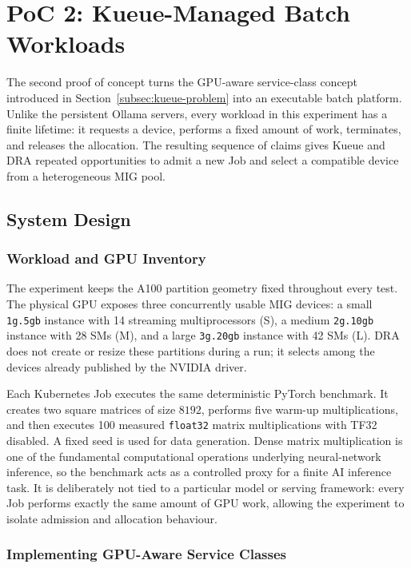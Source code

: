 \section{PoC 2: Kueue-Managed Batch Workloads}
\label{sec:kueue-use-case}

The second proof of concept turns the GPU-aware service-class concept introduced in Section~\ref{subsec:kueue-problem} into an executable batch platform. Unlike the persistent Ollama servers, every workload in this experiment has a finite lifetime: it requests a device, performs a fixed amount of work, terminates, and releases the allocation. The resulting sequence of claims gives Kueue and DRA repeated opportunities to admit a new Job and select a compatible device from a heterogeneous MIG pool.

\subsection{System Design}
\label{subsec:kueue-architecture}

\subsubsection{Workload and GPU Inventory}

The experiment keeps the A100 partition geometry fixed throughout every test. The physical GPU exposes three concurrently usable MIG devices: a small \texttt{1g.5gb} instance with 14 streaming multiprocessors (S), a medium \texttt{2g.10gb} instance with 28 SMs (M), and a large \texttt{3g.20gb} instance with 42 SMs (L). DRA does not create or resize these partitions during a run; it selects among the devices already published by the NVIDIA driver.

Each Kubernetes Job executes the same deterministic PyTorch benchmark. It creates two square matrices of size $8192$, performs five warm-up multiplications, and then executes 100 measured \texttt{float32} matrix multiplications with TF32 disabled. A fixed seed is used for data generation. Dense matrix multiplication is one of the fundamental computational operations underlying neural-network inference, so the benchmark acts as a controlled proxy for a finite AI inference task. It is deliberately not tied to a particular model or serving framework: every Job performs exactly the same amount of GPU work, allowing the experiment to isolate admission and allocation behaviour.

\subsubsection{Implementing GPU-Aware Service Classes}

